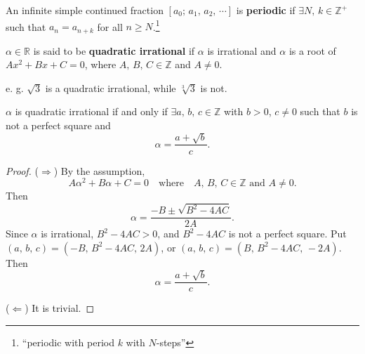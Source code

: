 \begin{definition}
    An infinite simple continued fraction $\left[ a_0;\,a_1,\,a_2,\,\cdots \right]$
    is \textbf{periodic} if $\exists N,\,k\in\mathbb{Z}^+$ such that
    $a_n=a_{n+k}$ for all $n \geq N$.\footnote{
        ``periodic with period $k$ with $N$-steps''
    }
\end{definition}

\begin{definition}
    $\alpha \in \mathbb{R}$ is said to be \textbf{quadratic irrational}
    if $\alpha$ is irrational and $\alpha$ is a root of $Ax^2+Bx+C=0$,
    where $A,\,B,\,C \in \mathbb{Z}$ and $A \neq 0$.
\end{definition}

e. g. $\sqrt{3}$ is a quadratic irrational, while $\sqrt[3]{3}$ is not.

\begin{lemma}
    $\alpha$ is quadratic irrational if and only if $\exists a,\,b,\,c \in \mathbb{Z}$
    with $b > 0$, $c \neq 0$ such that $b$ is not a perfect square and
    \[
        \alpha = \frac{a+\sqrt{b}}{c}.
    \]
\end{lemma}

\begin{proof}
    ($\Rightarrow$) By the assumption,
    \[
        A\alpha^2+B\alpha+C=0 \quad \mbox{where} \quad A,\,B,\,C \in \mathbb{Z} \mbox{ and } A \neq 0.
    \]
    Then
    \[
        \alpha = \frac{-B\pm\sqrt{B^2-4AC}}{2A}.
    \]
    Since $\alpha$ is irrational, $B^2 - 4AC > 0$, and $B^2-4AC$ is not a perfect square.
    Put $\left( a,\,b,\,c \right) = \left( -B,\,B^2-4AC,\,2A \right)$,
    or $\left( a,\,b,\,c \right) = \left( B,\,B^2-4AC,\,-2A \right)$. Then
    \[
        \alpha = \frac{a+\sqrt{b}}{c}.
    \]

    ($\Leftarrow$) It is trivial.
\end{proof}